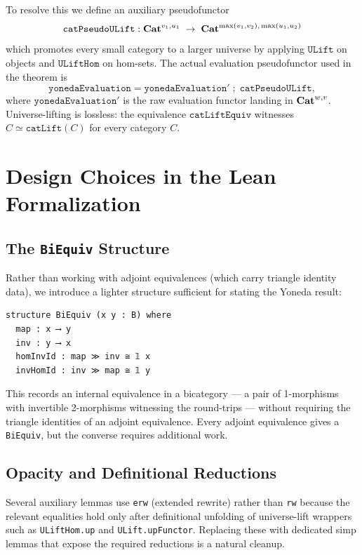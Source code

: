 \documentclass[12pt]{article}
\begin{document}
To resolve this we define an auxiliary pseudofunctor
\[
  \mathtt{catPseudoULift} : \mathbf{Cat}^{v_1, u_1} \;\to\; \mathbf{Cat}^{\max(v_1,v_2),\, \max(u_1,u_2)}
\]
which promotes every small category to a larger universe by applying
$\mathtt{ULift}$ on objects and $\mathtt{ULiftHom}$ on hom-sets.  The actual evaluation
pseudofunctor used in the theorem is
\[
  \mathtt{yonedaEvaluation} = \mathtt{yonedaEvaluation'} \;;\; \mathtt{catPseudoULift},
\]
where $\mathtt{yonedaEvaluation'}$ is the raw evaluation functor landing in
$\mathbf{Cat}^{w,v}$.  Universe-lifting is lossless: the equivalence
$\mathtt{catLiftEquiv}$ witnesses $C \simeq \mathtt{catLift}(C)$ for every category $C$.

\section{Design Choices in the Lean Formalization}\label{sec:lean}

\subsection{The \texttt{BiEquiv} Structure}

Rather than working with adjoint equivalences (which carry triangle identity data), we
introduce a lighter structure sufficient for stating the Yoneda result:

\begin{lstlisting}
structure BiEquiv (x y : B) where
  map : x ⟶ y
  inv : y ⟶ x
  homInvId : map ≫ inv ≅ 𝟙 x
  invHomId : inv ≫ map ≅ 𝟙 y
\end{lstlisting}

This records an internal equivalence in a bicategory --- a pair of 1-morphisms with
invertible 2-morphisms witnessing the round-trips --- without requiring the triangle
identities of an adjoint equivalence.  Every adjoint equivalence gives a
\lstinline{BiEquiv}, but the converse requires additional work.

\subsection{Opacity and Definitional Reductions}

Several auxiliary lemmas use \lstinline{erw} (extended rewrite) rather than \lstinline{rw}
because the relevant equalities hold only after definitional unfolding of universe-lift
wrappers such as \lstinline{ULiftHom.up} and \lstinline{ULift.upFunctor}.  Replacing
these with dedicated simp lemmas that expose the required reductions is a natural
cleanup.
\end{document}
